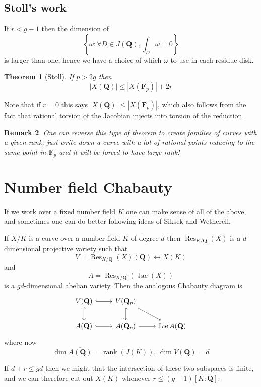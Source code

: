 \documentclass[oneside,11pt,]{article}
\newtheorem{theorem}{Theorem}
\newtheorem{remark}[theorem]{Remark}
\DeclareMathOperator{\Jac}{Jac}
\DeclareMathOperator{\rank}{rank}
\DeclareMathOperator{\Res}{Res}
\newcommand{\QQ}{\mathbf{Q}}
\let\emph\relax %
\begin{document}
\subsection{Stoll's work}
If $r < g - 1$ then the dimension of
\[
\left\{\omega :\forall D \in J(\mathbf Q), \int_D \omega = 0 \right\}\]
is larger than one, hence we have a choice of which $\omega$ to use in each residue disk.

\begin{theorem}[Stoll]
    If $p > 2g$ then
    \[
        | X(\mathbf Q)| \le | X(\mathbf F_p)| + 2r
    \]
\end{theorem}

Note that if $r=0$ this says $| X(\mathbf Q)| \le | X(\mathbf F_p)|$, which also follows from the fact that rational torsion of the Jacobian injects into torsion of the reduction.

\begin{remark}
    One can reverse this type of theorem to create families of curves with a given rank, just write down a curve with a lot of rational points reducing to the same point in $\mathbf F_p$ and it will be forced to have large rank!
\end{remark}

\section{Number field Chabauty}
If we work over a fixed number field $K$ one can make sense of all of the above, and sometimes one can do better following ideas of Siksek and Wetherell.

If $X/K$ is a curve over a number field $K$ of degree $d$ then \(\Res_{K/\QQ} (X)\)
is a $d$-dimensional projective variety such that
\[V = \Res_{K/\QQ} (X)(\QQ) \leftrightarrow X(K)\]
and
\[A = \Res_{K/\QQ} (\Jac(X))\]
is a $gd$-dimensional abelian variety.
Then the analogous Chabauty diagram is
\[\begin{tikzcd}
	{V(\mathbf Q)} & {V(\mathbf Q_p)} \\
    {A(\mathbf Q)} & {A(\mathbf Q_p)} & {\operatorname{Lie} A (\mathbf Q)}
	\arrow[hook, from=1-1, to=1-2]
	\arrow[hook, from=1-1, to=2-1]
	\arrow[hook, from=1-2, to=2-2]
	\arrow[hook, from=2-1, to=2-2]
	\arrow[from=1-2, to=2-3]
	\arrow[from=2-2, to=2-3]
\end{tikzcd}\]
where now
\[\dim \overline{A(\QQ)} = \rank(J(K)),\,
\dim V(\QQ) = d\]

If \(d + r \le gd \) then we might \emph{hope} that the intersection of these two subspaces is finite, and we can therefore cut out $X(K)$ whenever
\(r \le (g - 1)[K : \QQ]\).
\end{document}
